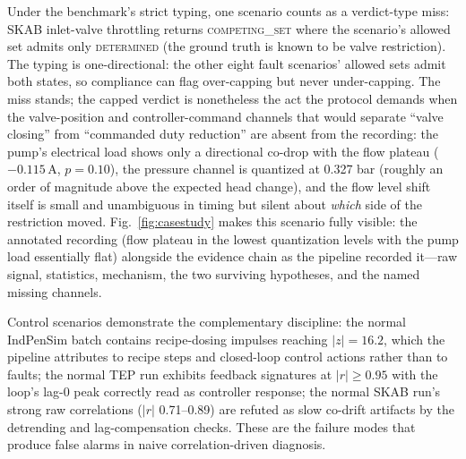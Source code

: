 \documentclass[preprint,12pt]{elsarticle}
\begin{document}
Under the benchmark's strict typing, one scenario counts as a verdict-type miss: SKAB inlet-valve throttling returns \mbox{\textsc{competing\_set}} where the scenario's allowed set admits only \mbox{\textsc{determined}} (the ground truth is known to be valve restriction). The typing is one-directional: the other eight fault scenarios' allowed sets admit both states, so compliance can flag over-capping but never under-capping. The miss stands; the capped verdict is nonetheless the act the protocol demands when the valve-position and controller-command channels that would separate ``valve closing'' from ``commanded duty reduction'' are absent from the recording: the pump's electrical load shows only a directional co-drop with the flow plateau ($-0.115$\,A, $p{=}0.10$), the pressure channel is quantized at 0.327 bar (roughly an order of magnitude above the expected head change), and the flow level shift itself is small and unambiguous in timing but silent about \emph{which} side of the restriction moved. Fig.~\ref{fig:casestudy} makes this scenario fully visible: the annotated recording (flow plateau in the lowest quantization levels with the pump load essentially flat) alongside the evidence chain as the pipeline recorded it---raw signal, statistics, mechanism, the two surviving hypotheses, and the named missing channels.

Control scenarios demonstrate the complementary discipline: the normal IndPenSim batch contains recipe-dosing impulses reaching $|z|{=}16.2$, which the pipeline attributes to recipe steps and closed-loop control actions rather than to faults; the normal TEP run exhibits feedback signatures at $|r|\ge 0.95$ with the loop's lag-0 peak correctly read as controller response; the normal SKAB run's strong raw correlations ($|r|$ 0.71--0.89) are refuted as slow co-drift artifacts by the detrending and lag-compensation checks. These are the failure modes that produce false alarms in naive correlation-driven diagnosis.
\end{document}

